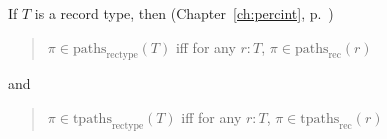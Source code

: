 
 If  $T$ is a record type, then  (Chapter~\ref{ch:percint}, p.~\pageref{ex:paths-rectype})
\begin{quote} 
 

  $\pi\in\mathrm{paths}_{\text{rectype}}(T)$ iff for any $r:T$, $\pi\in\mathrm{paths}_{\text{rec}}(r)$ 
\end{quote}
and
\begin{quote}
 $\pi\in\mathrm{tpaths}_{\text{rectype}}(T)$ iff for any $r:T$, $\pi\in\mathrm{tpaths}_{\text{rec}}(r)$  
 
\end{quote} 


          
          
  




 
